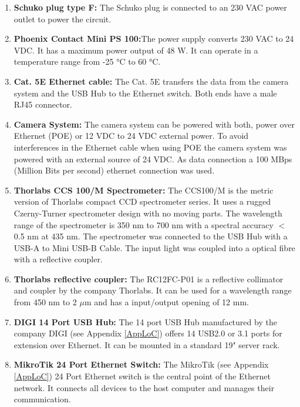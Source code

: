 \begin{enumerate}
	\item \textbf{Schuko plug type F:} The Schuko plug is connected to an 230 VAC power outlet to power the circuit.
	\item \textbf{Phoenix Contact Mini PS 100:}The power supply converts 230 VAC to 24 VDC. It has a maximum power output of 48 W. It can operate in a temperature range from -25 °C to 60 °C.\cite{RSComponents}
	\item \textbf{Cat. 5E Ethernet cable:} The Cat. 5E transfers the data from the camera system and the USB Hub to the Ethernet switch. Both ends have a male RJ45 connector.
	\item \textbf{Camera System:} The camera system can be powered with both, power over Ethernet (POE) or 12 VDC to 24 VDC external power. To avoid interferences in the Ethernet cable when using POE the camera system was powered with an external source of 24 VDC. As data connection a 100 MBps (Million Bits per second) ethernet connection was used.
	\item \textbf{Thorlabs CCS 100/M Spectrometer:} The CCS100/M is the metric version of Thorlabs compact CCD spectrometer series. It uses a rugged Czerny-Turner spectrometer design with no moving parts. The wavelength range of the spectrometer is 350 nm to 700 nm with a spectral accuracy $<$0.5 nm at 435 nm. The spectrometer was connected to the USB Hub with a USB-A to Mini USB-B Cable. The input light was coupled into a optical fibre with a reflective coupler.\cite{ThorlabsCCS}
	\item \textbf{Thorlabs reflective coupler:} The RC12FC-P01 is a reflective collimator and coupler by the company Thorlabs. It can be used for a wavelength range from 450 nm to 2 $\mu$m and has a input/output opening of 12 mm.\cite{ThorlabsCoupler}
	\item \textbf{DIGI 14 Port USB Hub:} The 14 port USB Hub manufactured by the company DIGI (see Appendix \ref{AppLoC}) offers 14 USB2.0 or 3.1 ports for extension over Ethernet. It can be mounted in a standard 19" server rack. 
	\item \textbf{MikroTik 24 Port Ethernet Switch:} The MikroTik (see Appendix \ref{AppLoC}) 24 Port Ethernet switch is the central point of the Ethernet network. It connects all devices to the host computer and manages their communication.
\end{enumerate}

